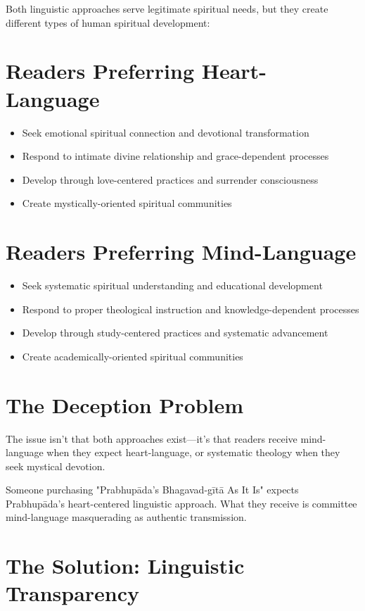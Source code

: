 \documentclass[11pt,twoside]{book}
\begin{document}
Both linguistic approaches serve legitimate spiritual needs, but they create different types of human spiritual development:
\section*{Readers Preferring Heart-Language}
\label{sec:org0416e0e}
\begin{itemize}
\item Seek emotional spiritual connection and devotional transformation
\item Respond to intimate divine relationship and grace-dependent processes
\item Develop through love-centered practices and surrender consciousness
\item Create mystically-oriented spiritual communities
\end{itemize}
\section*{Readers Preferring Mind-Language}
\label{sec:orga71c57b}
\begin{itemize}
\item Seek systematic spiritual understanding and educational development
\item Respond to proper theological instruction and knowledge-dependent processes
\item Develop through study-centered practices and systematic advancement
\item Create academically-oriented spiritual communities
\end{itemize}
\section*{The Deception Problem}
\label{sec:org95f8246}

The issue isn't that both approaches exist—it's that readers receive mind-language when they expect heart-language, or systematic theology when they seek mystical devotion.

Someone purchasing "Prabhupāda's Bhagavad-gītā As It Is" expects Prabhupāda's heart-centered linguistic approach. What they receive is committee mind-language masquerading as authentic transmission.
\section*{The Solution: Linguistic Transparency}
\label{sec:orgee75705}
\end{document}
